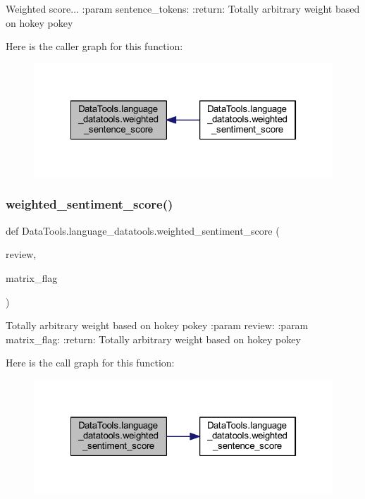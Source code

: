 \begin{DoxyVerb}Weighted score...
:param sentence_tokens:
:return: Totally arbitrary weight based on hokey pokey
\end{DoxyVerb}
 Here is the caller graph for this function\+:
\nopagebreak
\begin{figure}[H]
\begin{center}
\leavevmode
\includegraphics[width=322pt]{namespace_data_tools_1_1language__datatools_a4d48db81c591efbde6b9b4f57764954c_icgraph}
\end{center}
\end{figure}
\mbox{\label{namespace_data_tools_1_1language__datatools_a458225ca6e39d79be8054fe60000bf77}} 
\subsubsection{\texorpdfstring{weighted\+\_\+sentiment\+\_\+score()}{weighted\_sentiment\_score()}}
{\footnotesize\ttfamily def Data\+Tools.\+language\+\_\+datatools.\+weighted\+\_\+sentiment\+\_\+score (\begin{DoxyParamCaption}\item[{}]{review,  }\item[{}]{matrix\+\_\+flag }\end{DoxyParamCaption})}

\begin{DoxyVerb}    Totally arbitrary weight based on hokey pokey
:param review:
:param matrix_flag:
:return: Totally arbitrary weight based on hokey pokey
\end{DoxyVerb}
 Here is the call graph for this function\+:
\nopagebreak
\begin{figure}[H]
\begin{center}
\leavevmode
\includegraphics[width=322pt]{namespace_data_tools_1_1language__datatools_a458225ca6e39d79be8054fe60000bf77_cgraph}
\end{center}
\end{figure}
